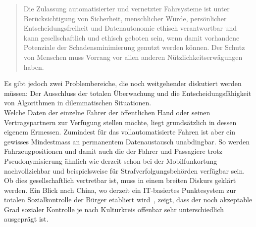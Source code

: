 \documentclass[twoside,a4paper,12pt]{article}
\begin{document}
\begin{quote}
\glqq
Die Zulassung automatisierter und vernetzter Fahrsysteme ist unter Berücksichtigung von Sicherheit, menschlicher Würde, persönlicher Entscheidungsfreiheit und Datenautonomie ethisch verantwortbar und kann gesellschaftlich und ethisch geboten sein, wenn damit vorhandene Potenziale der Schadensminimierung genutzt werden können. Der Schutz von Menschen muss Vorrang vor allen anderen Nützlichkeitserwägungen haben.\grqq\mbox{~\cite[S. 3]{bmvi5}}
\end{quote}

Es gibt jedoch zwei Problembereiche, die noch weitgehender diskutiert werden müssen: Der Ausschluss der totalen Überwachung und die 
Entscheidungsfähigkeit von Algorithmen in dilemmatischen Situationen.\\

Welche Daten der einzelne Fahrer der öffentlichen Hand oder seinen Vertragspartnern zur Verfügung stellen möchte, liegt grundsätzlich in dessen eigenem
Ermessen. Zumindest für das vollautomatisierte Fahren ist aber ein gewisses Mindestmass an permanentem Datenaustausch unabdingbar. So werden 
Fahrzeugpositionen und damit auch die der Fahrer und Passagiere trotz Pseudonymisierung ähnlich wie derzeit schon bei der Mobilfunkortung nachvollziehbar 
und beispielsweise für Strafverfolgungsbehörden verfügbar sein. Ob dies gesellschaftlich vertretbar ist, muss in einem breiten Diskurs geklärt werden.  
Ein Blick nach China, wo derzeit ein IT-basiertes Punktesystem zur totalen Sozialkontrolle der Bürger etabliert wird~\cite{df}, zeigt, dass der noch akzeptable 
Grad sozialer Kontrolle je nach Kulturkreis offenbar sehr unterschiedlich ausgeprägt ist.\\





\newpage
\end{document}
